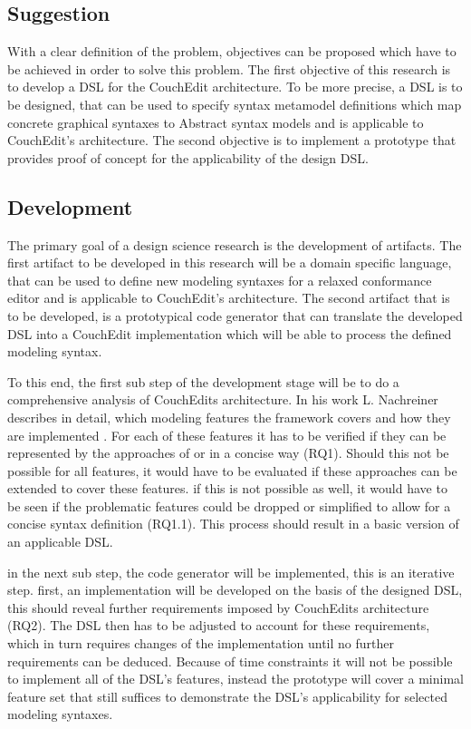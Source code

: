 \documentclass[10pt,a4paper,oneside]{scrartcl}
\begin{document}
\subsection{Suggestion}
With a clear definition of the problem, objectives can be proposed which have to be achieved in order to solve this problem. The first objective of this research is to develop a DSL for the CouchEdit architecture. To be more precise, a DSL is to be designed, that can be used to specify syntax metamodel definitions which map concrete graphical syntaxes to Abstract syntax models and is applicable to CouchEdit's architecture. The second objective is to implement a prototype that provides proof of concept for the applicability of the design DSL.


\subsection{Development}
The primary goal of a design science research is the development of artifacts.
The first artifact to be developed in this research will be a domain specific language, that can be used to define new modeling syntaxes for a relaxed conformance editor and is applicable to CouchEdit's architecture. The second artifact that is to be developed, is a prototypical code generator that can translate the developed DSL into a CouchEdit implementation which will be able to process the defined modeling syntax.

To this end, the first sub step of the development stage will be to do a comprehensive analysis of CouchEdits architecture. In his work L. Nachreiner describes in detail, which modeling features the framework covers and how they are implemented \cite{nachreiner_couchedit_2020}. For each of these features it has to be verified if they can be represented by the approaches of \cite{minas_specifying_2001} or \cite{fondement_making_2005} in a concise way (RQ1). Should this not be possible for all features, it would have to be evaluated if these approaches can be extended to cover these features. if this is not possible as well, it would have to be seen if the problematic features could be dropped or simplified to allow for a concise syntax definition (RQ1.1). This process should result in a basic version of an applicable DSL.

in the next sub step, the code generator will be implemented, this is an iterative step. first, an implementation will be developed on the basis of the designed DSL, this should reveal further requirements imposed by CouchEdits architecture (RQ2). The DSL then has to be adjusted to account for these requirements, which in turn requires changes of the implementation until no further requirements can be deduced. Because of time constraints it will not be possible to implement all of the DSL's features, instead the prototype will cover a minimal feature set that still suffices to demonstrate the DSL's applicability for selected modeling syntaxes.
\end{document}
